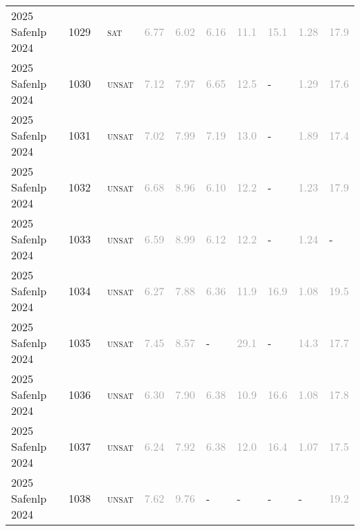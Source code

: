 \begin{center}
{\begin{longtable}{@{}llllllllll@{}}
2025 Safenlp 2024 & 1029 & ~\textsc{sat} & \textcolor{darkgray}{6.77} & \textcolor{darkgray}{6.02} & \textcolor{darkgray}{6.16} & \textcolor{darkgray}{11.1} & \textcolor{darkgray}{15.1} & \textcolor{darkgray}{1.28} & \textcolor{darkgray}{17.9} \\
2025 Safenlp 2024 & 1030 & ~\textsc{unsat} & \textcolor{darkgray}{7.12} & \textcolor{darkgray}{7.97} & \textcolor{darkgray}{6.65} & \textcolor{darkgray}{12.5} & - & \textcolor{darkgray}{1.29} & \textcolor{darkgray}{17.6} \\
2025 Safenlp 2024 & 1031 & ~\textsc{unsat} & \textcolor{darkgray}{7.02} & \textcolor{darkgray}{7.99} & \textcolor{darkgray}{7.19} & \textcolor{darkgray}{13.0} & - & \textcolor{darkgray}{1.89} & \textcolor{darkgray}{17.4} \\
2025 Safenlp 2024 & 1032 & ~\textsc{unsat} & \textcolor{darkgray}{6.68} & \textcolor{darkgray}{8.96} & \textcolor{darkgray}{6.10} & \textcolor{darkgray}{12.2} & - & \textcolor{darkgray}{1.23} & \textcolor{darkgray}{17.9} \\
2025 Safenlp 2024 & 1033 & ~\textsc{unsat} & \textcolor{darkgray}{6.59} & \textcolor{darkgray}{8.99} & \textcolor{darkgray}{6.12} & \textcolor{darkgray}{12.2} & - & \textcolor{darkgray}{1.24} & - \\
2025 Safenlp 2024 & 1034 & ~\textsc{unsat} & \textcolor{darkgray}{6.27} & \textcolor{darkgray}{7.88} & \textcolor{darkgray}{6.36} & \textcolor{darkgray}{11.9} & \textcolor{darkgray}{16.9} & \textcolor{darkgray}{1.08} & \textcolor{darkgray}{19.5} \\
2025 Safenlp 2024 & 1035 & ~\textsc{unsat} & \textcolor{darkgray}{7.45} & \textcolor{darkgray}{8.57} & - & \textcolor{darkgray}{29.1} & - & \textcolor{darkgray}{14.3} & \textcolor{darkgray}{17.7} \\
2025 Safenlp 2024 & 1036 & ~\textsc{unsat} & \textcolor{darkgray}{6.30} & \textcolor{darkgray}{7.90} & \textcolor{darkgray}{6.38} & \textcolor{darkgray}{10.9} & \textcolor{darkgray}{16.6} & \textcolor{darkgray}{1.08} & \textcolor{darkgray}{17.8} \\
2025 Safenlp 2024 & 1037 & ~\textsc{unsat} & \textcolor{darkgray}{6.24} & \textcolor{darkgray}{7.92} & \textcolor{darkgray}{6.38} & \textcolor{darkgray}{12.0} & \textcolor{darkgray}{16.4} & \textcolor{darkgray}{1.07} & \textcolor{darkgray}{17.5} \\
2025 Safenlp 2024 & 1038 & ~\textsc{unsat} & \textcolor{darkgray}{7.62} & \textcolor{darkgray}{9.76} & - & - & - & - & \textcolor{darkgray}{19.2} \\

\end{longtable}}
\end{center}
